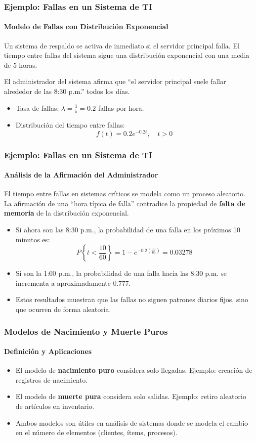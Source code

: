 \documentclass{beamer}
\begin{document}
\begin{frame}
\frametitle{Ejemplo: Fallas en un Sistema de TI}
\framesubtitle{Modelo de Fallas con Distribución Exponencial}

Un sistema de respaldo se activa de inmediato si el servidor principal falla. El tiempo entre fallas del sistema sigue una distribución exponencial con una media de 5 horas.

\vspace{0.3cm}
El administrador del sistema afirma que “el servidor principal suele fallar alrededor de las 8:30 p.m.” todos los días.

\begin{itemize}
    \item Tasa de fallas: $\lambda = \frac{1}{5} = 0.2$ fallas por hora.
    \item Distribución del tiempo entre fallas:
    \[
    f(t) = 0.2 e^{-0.2t}, \quad t > 0
    \]
\end{itemize}
\end{frame}

\begin{frame}
\frametitle{Ejemplo: Fallas en un Sistema de TI}
\framesubtitle{Análisis de la Afirmación del Administrador}

El tiempo entre fallas en sistemas críticos se modela como un proceso aleatorio. La afirmación de una “hora típica de falla” contradice la propiedad de \textbf{falta de memoria} de la distribución exponencial.

\begin{itemize}
    \item Si ahora son las 8:30 p.m., la probabilidad de una falla en los próximos 10 minutos es:
    \[
    P\left\{t < \frac{10}{60} \right\} = 1 - e^{-0.2 \left(\frac{10}{60}\right)} = 0.03278
    \]
    
    \item Si son la 1:00 p.m., la probabilidad de una falla hacia las 8:30 p.m. se incrementa a aproximadamente 0.777.

    \item Estos resultados muestran que las fallas no siguen patrones diarios fijos, sino que ocurren de forma aleatoria.
\end{itemize}
\end{frame}

\begin{frame}
\frametitle{Modelos de Nacimiento y Muerte Puros}
\framesubtitle{Definición y Aplicaciones}

\begin{itemize}
    \item El modelo de \textbf{nacimiento puro} considera solo llegadas. Ejemplo: creación de registros de nacimiento.
    \item El modelo de \textbf{muerte pura} considera solo salidas. Ejemplo: retiro aleatorio de artículos en inventario.
    \item Ambos modelos son útiles en análisis de sistemas donde se modela el cambio en el número de elementos (clientes, ítems, procesos).
\end{itemize}
\end{frame}
\end{document}
